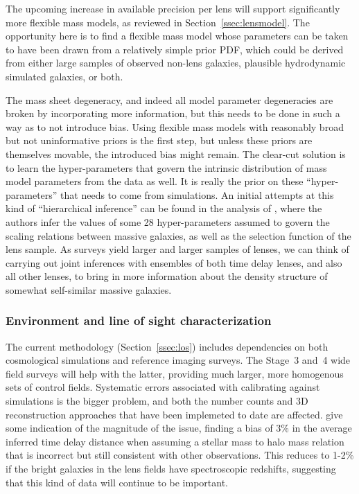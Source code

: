The upcoming increase in available precision per lens will support
significantly more flexible mass models, as reviewed in
Section~\ref{ssec:lensmodel}.
The opportunity here is to find a flexible mass model whose parameters
can be taken to have been drawn from a relatively simple prior PDF,
which could be derived from either large samples of observed non-lens
galaxies, plausible hydrodynamic simulated galaxies, or both.


The mass sheet degeneracy, and indeed all model parameter degeneracies
are broken by incorporating more information, but this needs to be
done in such a way as to not introduce bias. Using flexible mass
models with reasonably broad but not uninformative priors is the first
step, but unless these priors are themselves movable, the introduced
bias might remain. The clear-cut solution is to learn the
hyper-parameters that govern the intrinsic distribution of mass model
parameters from the data as well. It is really the prior on these
``hyper-parameters'' that needs to come from simulations. An initial
attempts at this kind of ``hierarchical inference'' can be found in
the analysis of \citet{SonnenfeldEtal2015}, where the authors infer
the values of some 28 hyper-parameters assumed to govern the scaling
relations between massive galaxies, as well as the selection function
of the lens sample. As surveys yield larger and larger samples of
lenses, we can think of carrying out joint inferences with ensembles
of both time delay lenses, and also all other lenses, to bring in more
information about the density structure of somewhat self-similar
massive galaxies.


\subsubsection{Environment and line of sight characterization} 

The current methodology (Section~\ref{ssec:los}) includes dependencies
on both cosmological simulations and reference imaging surveys. The
Stage~3 and~4 wide field surveys will help with the latter, providing
much larger, more homogenous sets of control fields.  Systematic
errors associated with calibrating against simulations is the bigger
problem, and both the number counts and 3D reconstruction approaches
that have been implemeted to date are affected.
\citet{CollettEtal2013} give some indication of the magnitude of the
issue, finding a bias of 3\% in the average inferred time delay distance
when assuming a stellar mass to halo mass relation that is incorrect
but still consistent with other observations. This reduces to 1-2\%
if the bright galaxies in the lens fields have spectroscopic redshifts,
suggesting that this kind of data will continue to be important.

